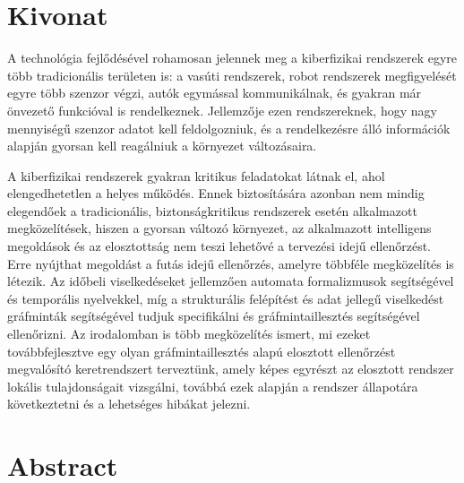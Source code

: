 \setcounter{page}{1}

\selecthungarian

\chapter*{Kivonat}

A technológia fejlődésével rohamosan jelennek meg a kiberfizikai rendszerek egyre több tradicionális területen is: a vasúti rendszerek, robot rendszerek megfigyelését egyre több szenzor végzi, autók egymással kommunikálnak, és gyakran már önvezető funkcióval is rendelkeznek. Jellemzője ezen rendszereknek, hogy nagy mennyiségű szenzor adatot kell feldolgozniuk, és a rendelkezésre álló információk alapján gyorsan kell reagálniuk a környezet változásaira.

A kiberfizikai rendszerek gyakran kritikus feladatokat látnak el, ahol elengedhetetlen a helyes működés. Ennek biztosítására azonban nem mindig elegendőek a tradicionális, biztonságkritikus rendszerek esetén alkalmazott megközelítések, hiszen a gyorsan változó környezet, az alkalmazott intelligens megoldások és az elosztottság nem teszi lehetővé a tervezési idejű ellenőrzést. Erre nyújthat megoldást a futás idejű ellenőrzés, amelyre többféle megközelítés is létezik. Az időbeli viselkedéseket jellemzően automata formalizmusok segítségével és temporális nyelvekkel, míg a strukturális felépítést és adat jellegű viselkedést gráfminták segítségével tudjuk specifikálni és gráfmintaillesztés segítségével ellenőrizni. Az irodalomban is több megközelítés ismert, mi ezeket továbbfejlesztve egy olyan gráfmintaillesztés alapú elosztott ellenőrzést megvalósító keretrendszert terveztünk, amely képes egyrészt az elosztott rendszer lokális tulajdonságait vizsgálni, továbbá ezek alapján a rendszer állapotára következtetni és a lehetséges hibákat jelezni.



\vfill
\selectenglish


\chapter*{Abstract}

